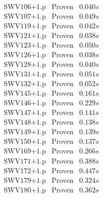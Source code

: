 \documentclass[a4paper,11pt]{report}
\theoremstyle{definition}
\theoremstyle{definition}
\theoremstyle{definition}
\theoremstyle{definition}
\theoremstyle{definition}
\theoremstyle{definition}
\theoremstyle{definition}
\begin{document}
\begin{minipage}{0.45\textwidth}
\[\begin{matrix}
			\text{SWV106+1.p}&\text{Proven}& 0.040 s\\
			\text{SWV107+1.p}&\text{Proven}& 0.049 s\\
			\text{SWV119+1.p}&\text{Proven}& 0.042 s\\
			\text{SWV121+1.p}&\text{Proven}& 0.038 s\\
			\text{SWV123+1.p}&\text{Proven}& 0.050 s\\
			\text{SWV126+1.p}&\text{Proven}& 0.038 s\\
			\text{SWV128+1.p}&\text{Proven}& 0.040 s\\
			\text{SWV131+1.p}&\text{Proven}& 0.051 s\\
			\text{SWV132+1.p}&\text{Proven}& 0.052 s\\
			\text{SWV145+1.p}&\text{Proven}& 0.161 s\\
			\text{SWV146+1.p}&\text{Proven}& 0.229 s\\
			\text{SWV147+1.p}&\text{Proven}& 0.141 s\\
			\text{SWV148+1.p}&\text{Proven}& 0.138 s\\
			\text{SWV149+1.p}&\text{Proven}& 0.139 s\\
			\text{SWV150+1.p}&\text{Proven}& 0.137 s\\
			\text{SWV169+1.p}&\text{Proven}& 0.266 s\\
			\text{SWV171+1.p}&\text{Proven}& 0.388 s\\
			\text{SWV172+1.p}&\text{Proven}& 0.447 s\\
			\text{SWV179+1.p}&\text{Proven}& 0.324 s\\
			\text{SWV180+1.p}&\text{Proven}& 0.362 s\\
		\end{matrix}\]
	\end{minipage}
\end{document}

